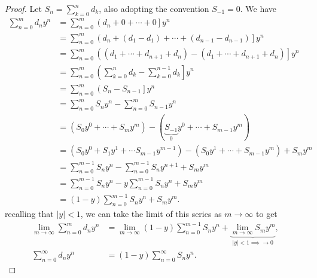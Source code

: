 \documentclass{article}
\theoremstyle{definition}
\begin{document}
\begin{proof}
		Let $ S_n = \sum_{k=0}^{n}d_k $, also adopting the convention  $ S_{-1}=0 $. We have 
		\begin{align*}
			\sum_{n=0}^{m}d_ny^n & = \sum_{n=0}^{m}\left(d_n + 0 + \cdots + 0\right]y^n \\
			& =  \sum_{n=0}^{m}\left(d_n + (d_1 - d_1) + \cdots + (d_{n-1} - d_{n-1})\right]y^n \\
			& =  \sum_{n=0}^{m}\left((d_1 + \cdots + d_{n+1} + d_n)- (d_1 + \cdots + d_{n+1} + d_n)\right]y^n\\
			& =  \sum_{n=0}^{m}\left(\sum_{k=0}^{n}d_k - \sum_{k=0}^{n-1}d_k\right]y^n\\
			& =  \sum_{n=0}^{m}\left(S_n - S_{n-1}\right]y^n\\
			& =  \sum_{n=0}^{m}S_ny^n - \sum_{n=0}^{m}S_{n-1}y^n\\
			& =  \left(S_0y^0 + \cdots + S_my^m\right) - (\underbrace{S_{-1}}_0y^0 + \cdots + S_{m-1}y^m)\\
			&= \left(S_0y^0 + S_1y^1 + \cdots S_{m-1}y^{m-1} \right) - (S_0y^1+ \cdots + S_{m-1}y^m) + S_my^m\\ 
			&= \sum_{n=0}^{m-1}S_ny^n - \sum_{n=0}^{m-1}S_ny^{n+1} + S_my^m\\
			&= \sum_{n=0}^{m-1}S_ny^n - y\sum_{n=0}^{m-1}S_ny^{n} + S_my^m\\
			&= (1-y)\sum_{n=0}^{m-1}S_ny^n + S_my^m.
		\end{align*}
		recalling that $ |y|<1 $, we can take the limit of this series as $ m\to\infty $ to get 
		\begin{align*}
			\lim_{m\to \infty}	\sum_{n=0}^{m}d_ny^n &= \lim_{m\to \infty}(1-y)\sum_{n=0}^{m-1}S_ny^n +\underbrace{\lim_{m\to \infty} S_my^m}_{|y| < 1 \implies \to 0},\\
			\sum_{n=0}^{\infty}d_ny^n &= (1-y)\sum_{n=0}^{\infty}S_ny^n.
		\end{align*}
		

\end{proof}
\end{document}
